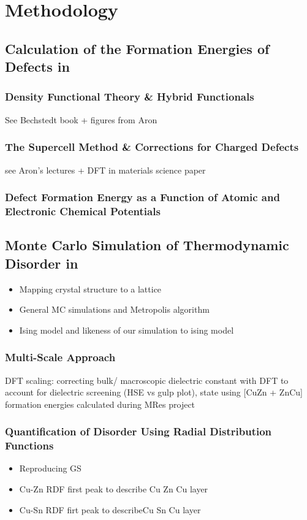 \chapter{Methodology}

\section{Calculation of the Formation Energies of Defects in \CZTS}
\subsection{Density Functional Theory \& Hybrid Functionals}
See Bechstedt book \cite{Bechstedt} + figures from Aron


\subsection{The Supercell Method \& Corrections for Charged Defects}\label{supercell_section}
see Aron's lectures + DFT in materials science paper \cite{DFT_in_mat}

\subsection{Defect Formation Energy as a Function of Atomic and Electronic Chemical Potentials}


\section{Monte Carlo Simulation of Thermodynamic Disorder  in \CZTS}
\begin{itemize}
\item Mapping crystal structure to a lattice
\item General MC simulations and Metropolis algorithm
\item Ising model and likeness of our simulation to ising model
\end{itemize}

\subsection{Multi-Scale Approach}
DFT scaling: correcting bulk/ macroscopic dielectric constant with DFT to account for dielectric screening (HSE vs gulp plot), state using [CuZn + ZnCu] formation energies calculated during MRes project

\subsection{Quantification of Disorder Using Radial Distribution Functions}
\begin{itemize}
\item Reproducing GS
\item Cu-Zn RDF first peak to describe Cu Zn Cu layer
\item Cu-Sn RDF firt peak to describeCu Sn Cu layer
\end{itemize}


